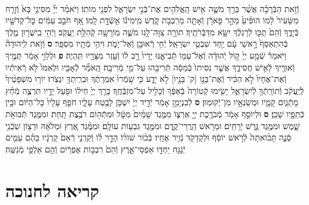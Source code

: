 \documentclass[twoside, openany, parskip=half, 11pt]{book}
\begin{document}
\begin{footnotesize}
\begin{multicols}{2}
\\
וְֿזֹ֣את הַבְּֿרָכָ֗ה אֲשֶׁ֨ר בֵּרַ֥ךְ מֹשֶׁ֛ה אִ֥ישׁ הָֽאֱלֹהִ֖ים אֶת־בְּֿנֵ֣י יִשְׂרָאֵ֑ל לִפְנֵ֖י מוֹתֽוֹ׃ וַיֹּאמַ֗ר יְיָ֞ מִסִּינַ֥י בָּא֙ וְֿזָרַ֤ח מִשֵּׂעִיר֙ לָ֔מוֹ הוֹפִ֨יעַ֙ מֵהַ֣ר פָּארָ֔ן וְֿאָתָ֖ה מֵרִֽבְבֹ֣ת קֹ֑דֶשׁ מִֽימִינ֕וֹ אֵ֥שְֿׁדָּ֖ת לָֽמוֹ׃ אַ֚ף חֹבֵ֣ב עַמִּ֔ים כׇּל־קְדֹשָׁ֖יו בְּֿיָדֶ֑ךָ וְֿהֵם֙ תֻּכּ֣וּ לְֿרַגְלֶ֔ךָ יִשָּׂ֖א מִדַּבְּֿרֹתֶֽיךָ׃ תּוֹרָ֥ה צִוָּה־לָ֖נוּ מֹשֶׁ֑ה מֽוֹרָשָׁ֖ה קְֿהִלַּ֥ת יַֽעֲקֹֽב׃ וַיְֿהִ֥י בִֽישֻׁר֖וּן מֶ֑לֶךְ בְּֿהִתְאַסֵּף֙ רָ֣אשֵׁי עָ֔ם יַ֖חַד שִׁבְטֵ֥י יִשְׂרָאֵֽל׃ יְֿחִ֥י רְֿאוּבֵ֖ן וְֿאַל־יָמֹ֑ת וִיהִ֥י מְֿתָ֖יו מִסְפָּֽר׃ \textbf{ס} וְֿזֹ֣את לִֽיהוּדָה֘ וַיֹּאמַר֒ שְֿׁמַ֤ע יְיָ֙ ק֣וֹל יְֿהוּדָ֔ה וְֿאֶל־עַמּ֖וֹ תְּֿבִיאֶ֑נּוּ יָדָיו֙ רָ֣ב ל֔וֹ וְֿעֵ֥זֶר מִצָּרָ֖יו תִּֽהְיֶה׃ \textbf{פ}
וּלְלֵוִ֣י אָמַ֔ר תֻּמֶּ֥יךָ וְֿאוּרֶ֖יךָ לְֿאִ֣ישׁ חֲסִידֶ֑ךָ אֲשֶׁ֤ר נִסִּיתוֹ֙ בְּֿמַסָּ֔ה תְּֿרִיבֵ֖הוּ עַל־מֵ֥י מְֿרִיבָֽה׃ הָֽאֹמֵ֞ר לְֿאָבִ֤יו וּלְאִמּוֹ֙ לֹ֣א רְֿאִיתִ֔יו וְֿאֶת־אֶחָיו֙ לֹ֣א הִכִּ֔יר וְֿאֶת־בָּנָ֖ו [ק' בָּנָ֖יו] לֹ֣א יָדָ֑ע כִּ֤י שָֽׁמְֿרוּ֙ אִמְרָתֶ֔ךָ וּבְרִֽיתְךָ֖ יִנְצֹֽרוּ׃ יוֹר֤וּ מִשְׁפָּטֶ֨יךָ֙ לְֿיַֽעֲקֹ֔ב וְֿתוֹרָֽתְֿךָ֖ לְֿיִשְׂרָאֵ֑ל יָשִׂ֤ימוּ קְֿטוֹרָה֙ בְּֿאַפֶּ֔ךָ וְֿכָלִ֖יל עַל־מִזְבְּֿחֶֽךָ׃ בָּרֵ֤ךְ יְיָ֙ חֵיל֔וֹ וּפֹ֥עַל יָדָ֖יו תִּרְצֶ֑ה מְֿחַ֨ץ מָתְֿנַ֧יִם קָמָ֛יו וּמְשַׂנְאָ֖יו מִן־יְֿקוּמֽוּן׃ \textbf{ס} לְֿבִנְיָמִ֣ן אָמַ֔ר יְֿדִ֣יד יְיָ֔ יִשְׁכֹּ֥ן לָבֶ֖טַח עָלָ֑יו חֹפֵ֤ף עָלָיו֙ כׇּל־הַיּ֔וֹם וּבֵ֥ין כְּֿתֵפָ֖יו שָׁכֵֽן׃ \textbf{ס}
וּלְיוֹסֵ֣ף אָמַ֔ר מְֿבֹרֶ֥כֶת יְיָ֖ אַרְצ֑וֹ מִמֶּ֤גֶד שָׁמַ֨יִם֙ מִטָּ֔ל וּמִתְּֿה֖וֹם רֹבֶ֥צֶת תָּֽחַת׃ וּמִמֶּ֖גֶד תְּֿבוּאֹ֣ת שָׁ֑מֶשׁ וּמִמֶּ֖גֶד גֶּ֥רֶשׁ יְֿרָחִֽים׃ וּמֵרֹ֖אשׁ הַֽרֲרֵי־קֶ֑דֶם וּמִמֶּ֖גֶד גִּבְע֥וֹת עוֹלָֽם׃ וּמִמֶּ֗גֶד אֶ֚רֶץ וּמְלֹאָ֔הּ וּרְצ֥וֹן שֹֽׁכְֿנִ֖י סְֿנֶ֑ה תָּב֨וֹאתָה֙ לְֿרֹ֣אשׁ יוֹסֵ֔ף וּלְקָדְקֹ֖ד נְֿזִ֥יר אֶחָֽיו׃ בְּֿכ֨וֹר שׁוֹר֜וֹ הָדָ֣ר ל֗וֹ וְֿקַרְנֵ֤י רְֿאֵם֙ קַרְנָ֔יו בָּהֶ֗ם עַמִּ֛ים יְֿנַגַּ֥ח יַחְדָּ֖ו אַפְסֵי־אָ֑רֶץ וְֿהֵם֙ רִבְב֣וֹת אֶפְרַ֔יִם וְֿהֵ֖ם אַלְפֵ֥י מְֿנַשֶּֽׁה׃

\end{multicols}


\newcommand{\tsource}[1]{\begin{scriptsize} \textsf{(#1)} \end{scriptsize}}
\section[חנוכה]{קריאה לחנוכה}


\end{footnotesize}
\end{document}
